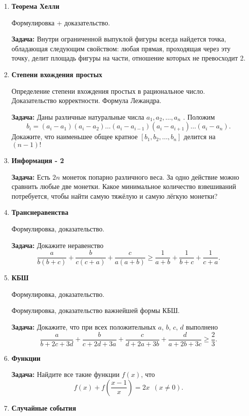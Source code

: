 \documentclass{article}
\begin{document}
\begin{enumerate}[label*=\protect\fbox{\arabic{enumi}}]
\item \textbf{Теорема Хелли}						

Формулировка + доказательство.

\textbf{Задача:} Внутри ограниченной выпуклой фигуры всегда найдется точка, обладающая следующим свойством: любая прямая, проходящая через эту точку, делит площадь фигуры на части, отношение которых не превосходит 2.

\item \textbf{Степени вхождения простых}

Определение степени вхождения простых в рациональное число. Доказательство корректности. Формула Лежандра.

\textbf{Задача:} Даны различные натуральные числа $a_1 , a_2 , \dotsc , a_n$ . Положим
$$b_i = (a_i - a_1)(a_i - a_2)\dotsc(a_i - a_{i-1})(a_i - a_{i+1})\dotsc(a_i - a_n).$$
Докажите, что наименьшее общее кратное $[b_1 , b_2 , \dotsc , b_n ]$ делится на $(n - 1)!$

\item \textbf{Информация - 2}						

\textbf{Задача:} Есть $2n$ монеток попарно различного веса. За одно действие можно сравнить любые две монетки. Какое минимальное количество взвешиваний потребуется, чтобы найти самую тяжёлую и самую лёгкую монетки?

\item \textbf{Транснеравенства}						

Формулировка, доказательство.

\textbf{Задача:} Докажите неравенство $$\frac{a}{b(b+c)} + \frac{b}{c(c+a)} + \frac{c}{a(a+b)} \geqslant \frac{1}{a+b} + \frac{1}{b+c} + \frac{1}{c+a}.$$

\item \textbf{КБШ}

Формулировка, доказательство.

Формулировка, доказательство важнейшей формы КБШ.

\textbf{Задача:} Докажите, что при всех положительных $a$, $b$, $c$, $d$ выполнено
$$
\frac{a}{b+2c+3d} + \frac{b}{c+2d+3a} + \frac{c}{d+2a+3b} +
\frac{d}{a+2b+3c} \geqslant \frac{2}{3}.
$$

\item \textbf{Функции}

\textbf{Задача:} Найдите все такие функции $f(x)$, что $$f(x) + f\left(\frac{x - 1}{x}\right) = 2x \,\,\, (x \neq  0).$$

\item \textbf{Случайные события}


\end{enumerate}
\end{document}
